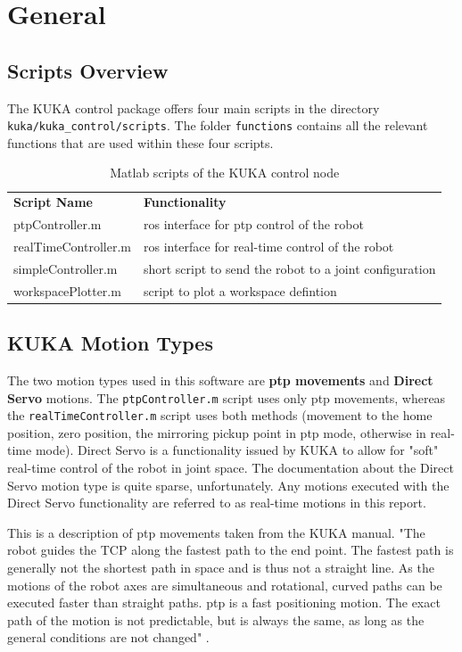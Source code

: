 \documentclass[headsepline,footinclude=false,fontsize=11pt,paper=a4,listof=totoc,bibliography=totoc,BCOR=12mm,DIV=14]{scrbook}
\begin{document}
\section{General}

\subsection{Scripts Overview}

The KUKA control package offers four main scripts in the directory \texttt{kuka/kuka\_control/scripts}. The folder \texttt{functions} contains all the relevant functions that are used within these four scripts. 

\begin{table}[h]
\centering
\begin{tabular}{ll}
\textbf{Script Name} & \textbf{Functionality}                                  \\
ptpController.m      & \gls{ros} interface for \gls{ptp} control of the robot              \\
realTimeController.m & \gls{ros} interface for real-time control of the robot        \\
simpleController.m   & short script to send the robot to a joint configuration \\
workspacePlotter.m   & script to plot a workspace defintion                   
\end{tabular}
\caption{Matlab scripts of the KUKA control node}
\label{tab:my-table}
\end{table}

\subsection{KUKA Motion Types}

The two motion types used in this software are \textbf{\gls{ptp} movements} and \textbf{Direct Servo} motions. The \texttt{ptpController.m} script uses only \gls{ptp} movements, whereas the \texttt{realTimeController.m} script uses both methods (movement to the home position, zero position, the mirroring pickup point in \gls{ptp} mode, otherwise in real-time mode). Direct Servo is a functionality issued by KUKA to allow for "soft" real-time control of the robot in joint space. The documentation about the Direct Servo motion type is quite sparse, unfortunately. Any motions executed with the Direct Servo functionality are referred to as real-time motions in this report.

This is a description of \gls{ptp} movements taken from the KUKA manual. "The robot guides the TCP along the fastest path to the end point. The fastest path is generally not the shortest path in space and is thus not a straight line. As the motions of the robot axes are simultaneous and rotational, curved paths can be executed faster than straight paths. \gls{ptp} is a fast positioning motion. The exact path of the motion is not predictable, but is always the same, as long as the general conditions are not changed" \cite[p.~303]{KukaManual}.
\end{document}
